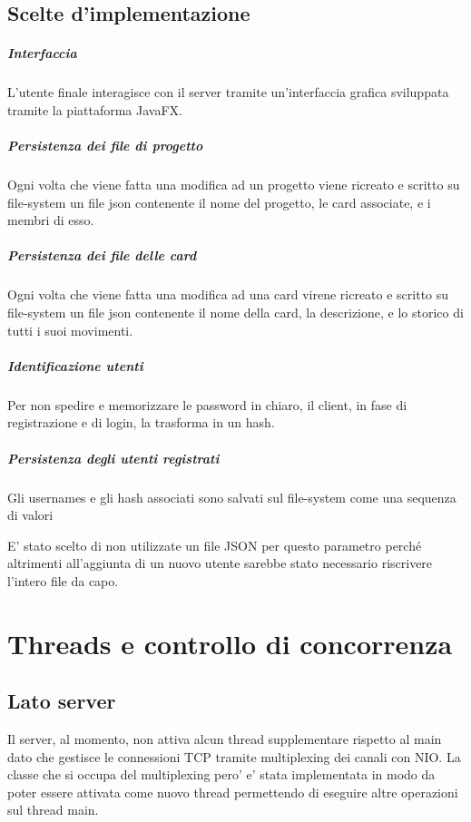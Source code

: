 \section*{Scelte d'implementazione}
\paragraph*{Interfaccia} L'utente finale interagisce con il server tramite un'interfaccia grafica sviluppata tramite la piattaforma JavaFX.
\paragraph*{Persistenza dei file di progetto} Ogni volta che viene fatta una modifica ad un progetto viene ricreato e scritto su file-system un file json contenente il nome del progetto, le card associate, e i membri di esso.
\paragraph*{Persistenza dei file delle card} Ogni volta che viene fatta una modifica ad una card virene ricreato e scritto su file-system un file json contenente il nome della card, la descrizione, e lo storico di tutti i suoi movimenti.
\paragraph*{Identificazione utenti} Per non spedire e memorizzare le password in chiaro, il client, in fase di registrazione e di login, la trasforma in un hash.
\paragraph*{Persistenza degli utenti registrati} Gli usernames e gli hash associati sono salvati sul file-system come una sequenza di valori
\begin{center}
\end{center}
E' stato scelto di non utilizzate un file JSON per questo parametro perché altrimenti all'aggiunta di un nuovo utente sarebbe stato necessario riscrivere l'intero file da capo.

\chapter*{Threads e controllo di concorrenza}
\section*{Lato server}
Il server, al momento, non attiva alcun thread supplementare rispetto al main dato che gestisce le connessioni TCP tramite multiplexing dei canali con NIO.
La classe che si occupa del multiplexing pero' e' stata implementata in modo da poter essere attivata come nuovo thread permettendo di eseguire altre operazioni sul thread main.

